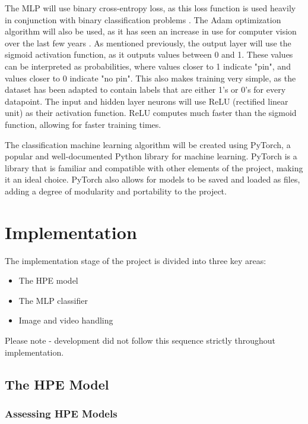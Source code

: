 \documentclass[a4paper, oneside, 11pt]{article}
\begin{document}
\bigskip
\noindent
The MLP will use binary cross-entropy loss, as this loss function is used heavily in conjunction with binary classification problems \cite{BinaryCrossEntropyLoss}. The Adam optimization algorithm will also be used, as it has seen an increase in use for computer vision over the last few years \cite{AdamOptimiser}. As mentioned previously, the output layer will use the sigmoid activation function, as it outputs values between 0 and 1. These values can be interpreted as probabilities, where values closer to 1 indicate "pin", and values closer to 0 indicate "no pin". This also makes training very simple, as the dataset has been adapted to contain labels that are either 1's or 0's for every datapoint. The input and hidden layer neurons will use ReLU (rectified linear unit) as their activation function. ReLU computes much faster than the sigmoid function, allowing for faster training times.

\bigskip
\noindent
The classification machine learning algorithm will be created using PyTorch, a popular and well-documented Python library for machine learning. PyTorch is a library that is familiar and compatible with other elements of the project, making it an ideal choice. PyTorch also allows for models to be saved and loaded as files, adding a degree of modularity and portability to the project.

\section{Implementation}

The implementation stage of the project is divided into three key areas:
\begin{itemize}
    \item The HPE model
    \item The MLP classifier
    \item Image and video handling
\end{itemize}

Please note - development did not follow this sequence strictly throughout implementation.

\subsection{The HPE Model}

\subsubsection{Assessing HPE Models}
\end{document}
